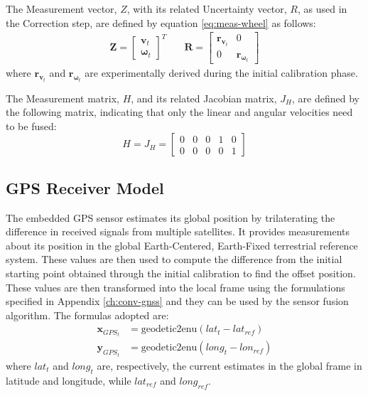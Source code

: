 The Measurement vector, $Z$, with its related Uncertainty vector, $R$, as used in the Correction step, are defined by equation \eqref{eq:meas-wheel} as follows:  
\begin{align}
\label{eq:meas-wheel}
\mathbf{Z}
=
\begin{bmatrix}
\mathbf{v}_t \\
\boldsymbol \omega_{t}
\end{bmatrix}^T
& \quad
\mathbf{R}
=
\begin{bmatrix}
\mathbf{r}_{\mathbf{v}_{t}} & 0\\
0 & \mathbf{r}_{\boldsymbol \omega_t}
\end{bmatrix}
\end{align}
where $\mathbf{r}_{\mathbf{v}_{t}}$ and $\mathbf{r}_{\boldsymbol \omega_t}$ are experimentally derived during the initial calibration phase.

The Measurement matrix, $H$, and its related Jacobian matrix, $J_H$, are defined by the following matrix, indicating that only the linear and angular velocities need to be fused:
\begin{equation}
H = J_H =
\begin{bmatrix}
0 & 0 & 0 & 1 & 0 \\
0 & 0 & 0 & 0 & 1
\end{bmatrix}
\end{equation}


\subsection{\gls{GPS} Receiver Model}
\label{sec:gps-rec-mod}
\noindent The embedded \gls{GPS} sensor estimates its global position by trilaterating the difference in received signals from multiple satellites. %
It provides measurements about its position in the global Earth-Centered, Earth-Fixed terrestrial reference system.
These values are then used to compute the difference from the initial starting point obtained through the initial calibration to find the offset position.
These values are then transformed into the local frame using the formulations specified in Appendix \ref{ch:conv-gnss} and they can be used by the sensor fusion algorithm.
The formulas adopted are: %
\begin{align}
\mathbf{x}_{GPS_t} & = \text{geodetic2enu}( lat_t - lat_{ref})\\
\mathbf{y}_{GPS_t} & = \text{geodetic2enu}( long_t - lon_{ref})
\end{align}
where $lat_t$ and $long_t$ are, respectively, the current estimates in the global frame in latitude and longitude,  while $lat_{ref}$ and $long_{ref}$. 

